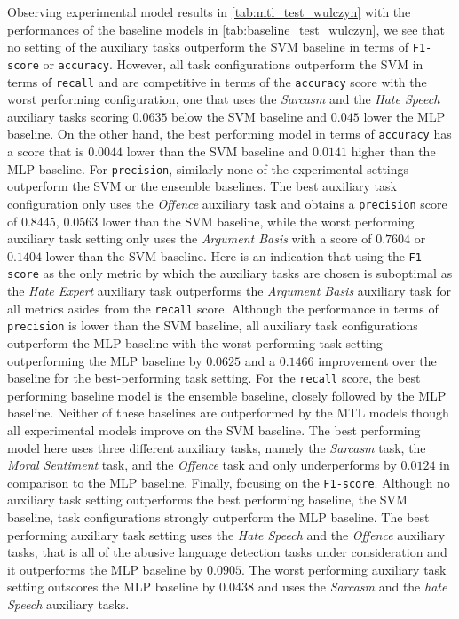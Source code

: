 Observing experimental model results in \cref{tab:mtl_test_wulczyn} with the performances of the baseline models in \cref{tab:baseline_test_wulczyn}, we see that no setting of the auxiliary tasks outperform the SVM baseline in terms of \texttt{F1-score} or \texttt{accuracy}.
However, all task configurations outperform the SVM in terms of \texttt{recall} and are competitive in terms of the \texttt{accuracy} score with the worst performing configuration, one that uses the \textit{Sarcasm} and the \textit{Hate Speech} auxiliary tasks scoring $0.0635$ below the SVM baseline and $0.045$ lower the MLP baseline.
On the other hand, the best performing model in terms of \texttt{accuracy} has a score that is $0.0044$ lower than the SVM baseline and $0.0141$ higher than the MLP baseline.
For \texttt{precision}, similarly none of the experimental settings outperform the SVM or the ensemble baselines.
The best auxiliary task configuration only uses the \textit{Offence} auxiliary task and obtains a \texttt{precision} score of $0.8445$, $0.0563$ lower than the SVM baseline, while the worst performing auxiliary task setting only uses the \textit{Argument Basis} with a score of $0.7604$ or $0.1404$ lower than the SVM baseline.
Here is an indication that using the \texttt{F1-score} as the only metric by which the auxiliary tasks are chosen is suboptimal as the \textit{Hate Expert} auxiliary task outperforms the \textit{Argument Basis} auxiliary task for all metrics asides from the \texttt{recall} score.
Although the performance in terms of \texttt{precision} is lower than the SVM baseline, all auxiliary task configurations outperform the MLP baseline with the worst performing task setting outperforming the MLP baseline by $0.0625$ and a $0.1466$ improvement over the baseline for the best-performing task setting.
For the \texttt{recall} score, the best performing baseline model is the ensemble baseline, closely followed by the MLP baseline.
Neither of these baselines are outperformed by the MTL models though all experimental models improve on the SVM baseline.
The best performing model here uses three different auxiliary tasks, namely the \textit{Sarcasm} task, the \textit{Moral Sentiment} task, and the \textit{Offence} task and only underperforms by $0.0124$ in comparison to the MLP baseline.
Finally, focusing on the \texttt{F1-score}.
Although no auxiliary task setting outperforms the best performing baseline, the SVM baseline, task configurations strongly outperform the MLP baseline.
The best performing auxiliary task setting uses the \textit{Hate Speech} and the \textit{Offence} auxiliary tasks, that is all of the abusive language detection tasks under consideration and it outperforms the MLP baseline by $0.0905$.
The worst performing auxiliary task setting outscores the MLP baseline by $0.0438$ and uses the \textit{Sarcasm} and the \textit{hate Speech} auxiliary tasks.

